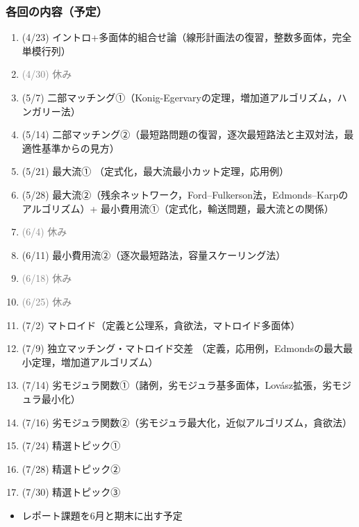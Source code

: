 \begin{frame}[allowframebreaks]
    \frametitle{各回の内容（予定）} 
    \small
    \begin{enumerate}
        \item (4/23) イントロ+多面体的組合せ論（線形計画法の復習，整数多面体，完全単模行列）
        \item[] \textcolor{gray}{(4/30) 休み}
        \item (5/7) 二部マッチング①（Konig-Egervaryの定理，増加道アルゴリズム，ハンガリー法）
        \item (5/14) 二部マッチング②（最短路問題の復習，逐次最短路法と主双対法，最適性基準からの見方）
        \item (5/21) 最大流① （定式化，最大流最小カット定理，応用例）
        \item (5/28) 最大流②（残余ネットワーク，Ford--Fulkerson法，Edmonds--Karpのアルゴリズム）+ 最小費用流①（定式化，輸送問題，最大流との関係）
        \item[] \textcolor{gray}{(6/4) 休み}
        \item (6/11) 最小費用流②（逐次最短路法，容量スケーリング法）
        \item[] \textcolor{gray}{(6/18) 休み}
        \item[] \textcolor{gray}{(6/25) 休み}
        \item (7/2) マトロイド（定義と公理系，貪欲法，マトロイド多面体） 
        \item (7/9) 独立マッチング・マトロイド交差 （定義，応用例，Edmondsの最大最小定理，増加道アルゴリズム）
        \item (7/14) 劣モジュラ関数①（諸例，劣モジュラ基多面体，Lov\'asz拡張，劣モジュラ最小化）
        \item (7/16) 劣モジュラ関数②（劣モジュラ最大化，近似アルゴリズム，貪欲法）
        \item (7/24) 精選トピック①
        \item (7/28) 精選トピック②
        \item (7/30) 精選トピック③
    \end{enumerate}

    \bigskip
    \begin{itemize}
        \item レポート課題を6月と期末に出す予定
    \end{itemize}
\end{frame}